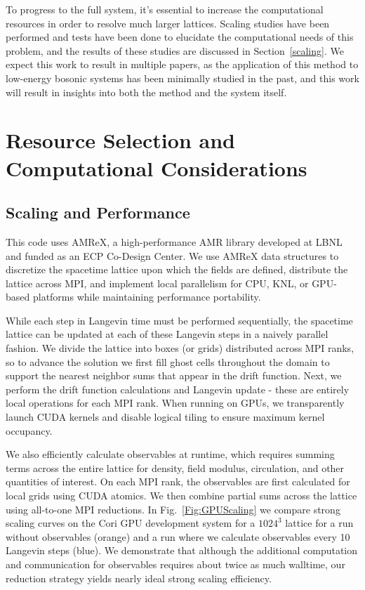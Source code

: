 \documentclass[onecolumn, 12pt]{article}
\begin{document}
To progress to the full system, it's essential to increase the computational resources in order to resolve much larger lattices. Scaling studies have been performed and tests have been done to elucidate the computational needs of this problem, and the results of these studies are discussed in Section~\ref{scaling}. We expect this work to result in multiple papers, as the application of this method to low-energy bosonic systems has been minimally studied in the past, and this work will result in insights into both the method and the system itself.

\section{Resource Selection and Computational Considerations}
\subsection{\label{scaling}Scaling and Performance}
This code uses AMReX, a high-performance AMR library developed at LBNL and funded as an ECP Co-Design Center. We use AMReX data structures to discretize the spacetime lattice upon which the fields are defined, distribute the lattice across MPI, and implement local parallelism for CPU, KNL, or GPU-based platforms while maintaining performance portability. 

While each step in Langevin time must be performed sequentially, the spacetime lattice can be updated at each of these Langevin steps in a naively parallel fashion. We divide the lattice into boxes (or grids) distributed across MPI ranks, so to advance the solution we first fill ghost cells throughout the domain to support the nearest neighbor sums that appear in the drift function. Next, we perform the drift function calculations and Langevin update - these are entirely local operations for each MPI rank. %
When running on GPUs, we transparently launch CUDA kernels and disable logical tiling to ensure maximum kernel occupancy.

We also efficiently calculate observables at runtime, which requires summing terms across the entire lattice for density, field modulus, circulation, and other quantities of interest. On each MPI rank, the observables are first calculated for local grids 
using CUDA atomics. We then combine partial sums across the lattice using all-to-one MPI reductions. In Fig.~\ref{Fig:GPUScaling} we compare strong scaling curves on the Cori GPU development system for a $1024^3$ lattice for a run without observables (orange) and a run where we calculate observables every 10 Langevin steps (blue). We demonstrate that although the additional computation and communication for observables requires about twice as much walltime, our reduction strategy yields nearly ideal strong scaling efficiency.
\end{document}
